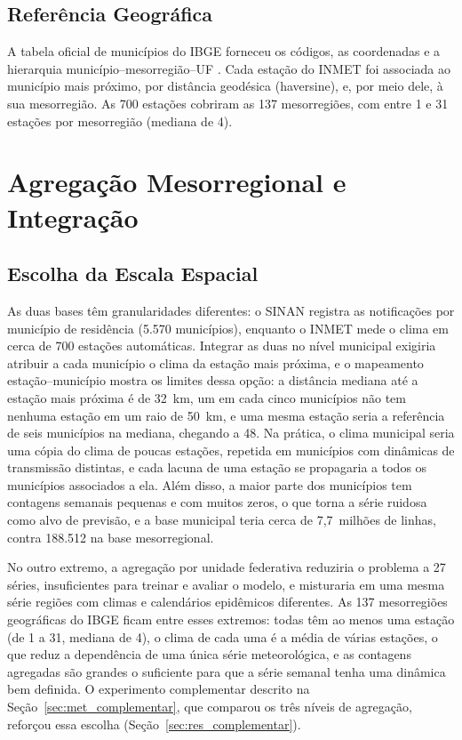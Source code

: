 \subsection{Referência Geográfica}

A tabela oficial de municípios do IBGE forneceu os códigos, as coordenadas e a hierarquia município--mesorregião--UF \cite{ibge1990mesorregioes}. Cada estação do INMET foi associada ao município mais próximo, por distância geodésica (haversine), e, por meio dele, à sua mesorregião. As 700 estações cobriram as 137 mesorregiões, com entre 1 e 31 estações por mesorregião (mediana de 4).

\section{Agregação Mesorregional e Integração}
\label{sec:agregacao}

\subsection{Escolha da Escala Espacial}

As duas bases têm granularidades diferentes: o SINAN registra as notificações por município de residência (5.570 municípios), enquanto o INMET mede o clima em cerca de 700 estações automáticas. Integrar as duas no nível municipal exigiria atribuir a cada município o clima da estação mais próxima, e o mapeamento estação--município mostra os limites dessa opção: a distância mediana até a estação mais próxima é de 32~km, um em cada cinco municípios não tem nenhuma estação em um raio de 50~km, e uma mesma estação seria a referência de seis municípios na mediana, chegando a 48. Na prática, o clima municipal seria uma cópia do clima de poucas estações, repetida em municípios com dinâmicas de transmissão distintas, e cada lacuna de uma estação se propagaria a todos os municípios associados a ela. Além disso, a maior parte dos municípios tem contagens semanais pequenas e com muitos zeros, o que torna a série ruidosa como alvo de previsão, e a base municipal teria cerca de 7,7~milhões de linhas, contra 188.512 na base mesorregional.

No outro extremo, a agregação por unidade federativa reduziria o problema a 27 séries, insuficientes para treinar e avaliar o modelo, e misturaria em uma mesma série regiões com climas e calendários epidêmicos diferentes. As 137 mesorregiões geográficas do IBGE \cite{ibge1990mesorregioes} ficam entre esses extremos: todas têm ao menos uma estação (de 1 a 31, mediana de 4), o clima de cada uma é a média de várias estações, o que reduz a dependência de uma única série meteorológica, e as contagens agregadas são grandes o suficiente para que a série semanal tenha uma dinâmica bem definida. O experimento complementar descrito na Seção~\ref{sec:met_complementar}, que comparou os três níveis de agregação, reforçou essa escolha (Seção~\ref{sec:res_complementar}).

